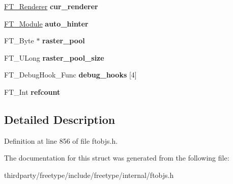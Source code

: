 \begin{DoxyCompactItemize}
\hyperlink{struct_f_t___renderer_rec__}{F\+T\+\_\+\+Renderer} {\bfseries cur\+\_\+renderer}
\item 
\mbox{\label{struct_f_t___library_rec___ae608b33b223905d4d70b782ed7ec8c78}} 
\hyperlink{struct_f_t___module_rec__}{F\+T\+\_\+\+Module} {\bfseries auto\+\_\+hinter}
\item 
\mbox{\label{struct_f_t___library_rec___aa8dd799d2efb7817b05c4a02a6828275}} 
F\+T\+\_\+\+Byte $\ast$ {\bfseries raster\+\_\+pool}
\item 
\mbox{\label{struct_f_t___library_rec___a798afdcaf0cda349eb454b769abfa251}} 
F\+T\+\_\+\+U\+Long {\bfseries raster\+\_\+pool\+\_\+size}
\item 
\mbox{\label{struct_f_t___library_rec___a1ba1f5abd0254a22dae533a9ac971b84}} 
F\+T\+\_\+\+Debug\+Hook\+\_\+\+Func {\bfseries debug\+\_\+hooks} \mbox{[}4\mbox{]}
\item 
\mbox{\label{struct_f_t___library_rec___a9c8e4e2bde3862cf3eb8011f4ce1dadb}} 
F\+T\+\_\+\+Int {\bfseries refcount}
\end{DoxyCompactItemize}


\subsection{Detailed Description}


Definition at line 856 of file ftobjs.\+h.



The documentation for this struct was generated from the following file\+:\begin{DoxyCompactItemize}
\item 
thirdparty/freetype/include/freetype/internal/ftobjs.\+h\end{DoxyCompactItemize}

